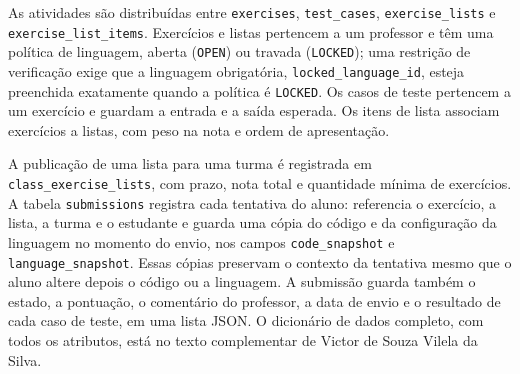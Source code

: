 As atividades são distribuídas entre \texttt{exercises}, \texttt{test\_cases}, \texttt{exercise\_lists} e \texttt{exercise\_list\_items}. Exercícios e listas pertencem a um professor e têm uma política de linguagem, aberta (\texttt{OPEN}) ou travada (\texttt{LOCKED}); uma restrição de verificação exige que a linguagem obrigatória, \texttt{locked\_language\_id}, esteja preenchida exatamente quando a política é \texttt{LOCKED}. Os casos de teste pertencem a um exercício e guardam a entrada e a saída esperada. Os itens de lista associam exercícios a listas, com peso na nota e ordem de apresentação.

A publicação de uma lista para uma turma é registrada em \texttt{class\_exercise\_lists}, com prazo, nota total e quantidade mínima de exercícios. A tabela \texttt{submissions} registra cada tentativa do aluno: referencia o exercício, a lista, a turma e o estudante e guarda uma cópia do código e da configuração da linguagem no momento do envio, nos campos \texttt{code\_snapshot} e \texttt{language\_snapshot}. Essas cópias preservam o contexto da tentativa mesmo que o aluno altere depois o código ou a linguagem. A submissão guarda também o estado, a pontuação, o comentário do professor, a data de envio e o resultado de cada caso de teste, em uma lista JSON. O dicionário de dados completo, com todos os atributos, está no texto complementar de Victor de Souza Vilela da Silva.
